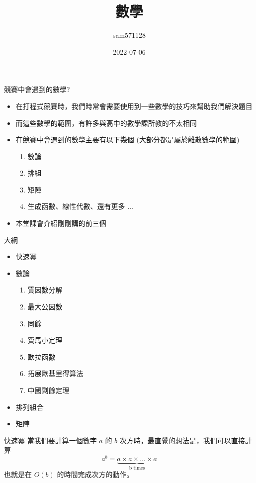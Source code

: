 \documentclass[aspectratio=169]{beamer}
\title{數學}
\author{sam571128}
\date{2022-07-06}
\begin{document}
\frame{\titlepage}

\begin{frame}{競賽中會遇到的數學?}
    \begin{itemize}
        \item 在打程式競賽時，我們時常會需要使用到一些數學的技巧來幫助我們解決題目
        \item 而這些數學的範圍，有許多與高中的數學課所教的不太相同
        \item 在競賽中會遇到的數學主要有以下幾個 (大部分都是屬於離散數學的範圍)
            \begin{enumerate}
                \item 數論
                \item 排組
                \item 矩陣
                \item 生成函數、線性代數、還有更多 $\ldots$
            \end{enumerate}
        \item<2-> 本堂課會介紹剛剛講的前三個
    \end{itemize}
\end{frame}

\begin{frame}{大綱}
    \begin{itemize}
        \item 快速冪
        \item 數論
            \begin{enumerate}
                \item 質因數分解
                \item 最大公因數
                \item 同餘
                \item 費馬小定理
                \item 歐拉函數
                \item 拓展歐基里得算法
                \item 中國剩餘定理
            \end{enumerate}
        \item 排列組合
        \item 矩陣
    \end{itemize}
\end{frame}

\begin{frame}{快速冪} 
    當我們要計算一個數字 $a$ 的 $b$ 次方時，最直覺的想法是，我們可以直接計算
    $$a^b = \underbrace{a \times a \times \dots \times a}_\text{b times}$$
    也就是在 $O(b)$ 的時間完成次方的動作。
\end{frame}
\end{document}
